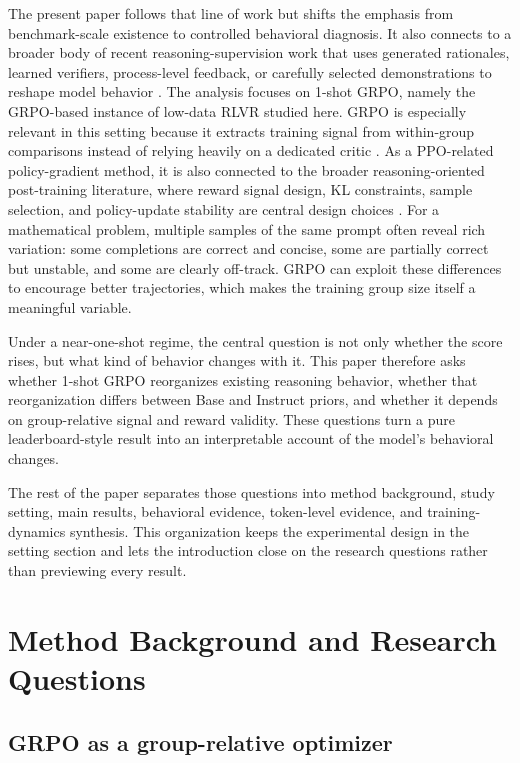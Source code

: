 \documentclass[12pt,a4paper]{ctexart}
\begin{document}
The present paper follows that line of work but shifts the emphasis from benchmark-scale existence to controlled behavioral diagnosis. It also connects to a broader body of recent reasoning-supervision work that uses generated rationales, learned verifiers, process-level feedback, or carefully selected demonstrations to reshape model behavior \cite{processbench2024,automatedprocess2024,limo2025,limr2025}. The analysis focuses on 1-shot GRPO, namely the GRPO-based instance of low-data RLVR studied here. GRPO is especially relevant in this setting because it extracts training signal from within-group comparisons instead of relying heavily on a dedicated critic \cite{deepseekmath}. As a PPO-related policy-gradient method, it is also connected to the broader reasoning-oriented post-training literature, where reward signal design, KL constraints, sample selection, and policy-update stability are central design choices \cite{ppo,deepseekr1,kimi15,oreo2024,limr2025}. For a mathematical problem, multiple samples of the same prompt often reveal rich variation: some completions are correct and concise, some are partially correct but unstable, and some are clearly off-track. GRPO can exploit these differences to encourage better trajectories, which makes the training group size itself a meaningful variable.

Under a near-one-shot regime, the central question is not only whether the score rises, but what kind of behavior changes with it. This paper therefore asks whether 1-shot GRPO reorganizes existing reasoning behavior, whether that reorganization differs between Base and Instruct priors, and whether it depends on group-relative signal and reward validity. These questions turn a pure leaderboard-style result into an interpretable account of the model's behavioral changes.

The rest of the paper separates those questions into method background, study setting, main results, behavioral evidence, token-level evidence, and training-dynamics synthesis. This organization keeps the experimental design in the setting section and lets the introduction close on the research questions rather than previewing every result.

\section{Method Background and Research Questions}

\subsection{GRPO as a group-relative optimizer}
\end{document}
